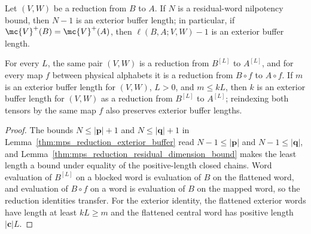 \begin{lemma}
    \label{thm:mps_reduction_blocking}
    \leanok
    Let $(V,W)$ be a reduction from $B$ to $A$.  If $N$ is a residual-word
    nilpotency bound, then $N-1$ is an exterior buffer length; in particular,
    if $\mc{V}^+(B)=\mc{V}^+(A)$, then $\ell(B,A;V,W)-1$ is an exterior
    buffer length.

    For every $L$, the same pair $(V,W)$ is a reduction from $B^{[L]}$ to
    $A^{[L]}$, and for every map $f$ between physical alphabets it is a
    reduction from $B\circ f$ to $A\circ f$.  If $m$ is an exterior buffer
    length for $(V,W)$, $L>0$, and $m\leq kL$, then $k$ is an exterior buffer
    length for $(V,W)$ as a reduction from $B^{[L]}$ to $A^{[L]}$; reindexing
    both tensors by the same map $f$ also preserves exterior buffer lengths.
\end{lemma}

\begin{proof}
    \leanok
    The bounds $N\leq|\mathbf p|+1$ and $N\leq|\mathbf q|+1$ in
    Lemma~\ref{thm:mps_reduction_exterior_buffer} read
    $N-1\leq|\mathbf p|$ and $N-1\leq|\mathbf q|$, and
    Lemma~\ref{thm:mps_reduction_residual_dimension_bound} makes the least
    length a bound under equality of the positive-length closed chains.
    Word evaluation of $B^{[L]}$ on a blocked word is evaluation of $B$ on
    the flattened word, and evaluation of $B\circ f$ on a word is evaluation
    of $B$ on the mapped word, so the reduction identities transfer.  For the
    exterior identity, the flattened exterior words have length at least
    $kL\geq m$ and the flattened central word has positive length $|\mathbf c|L$.
\end{proof}

